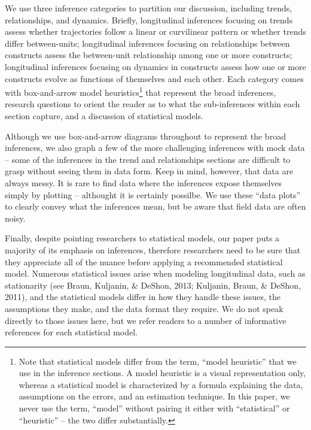 \documentclass[english,,man]{apa6}
\let\rmarkdownfootnote\footnote%
\def\footnote{\protect\rmarkdownfootnote}
\theoremstyle{definition}
\theoremstyle{definition}
\theoremstyle{definition}
\theoremstyle{remark}
\begin{document}
We use three inference categories to partition our discussion, including
trends, relationships, and dynamics. Briefly, longitudinal inferences
focusing on trends assess whether trajectories follow a linear or
curvilinear pattern or whether trends differ between-units; longitudinal
inferences focusing on relationships between constructs assess the
between-unit relationship among one or more constructs; longitudinal
inferences focusing on dynamics in constructs assess how one or more
constructs evolve as functions of themselves and each other. Each
category comes with box-and-arrow model heuristics\footnote{Note that
  statistical models differ from the term, \enquote{model heuristic}
  that we use in the inference sections. A model heuristic is a visual
  representation only, whereas a statistical model is characterized by a
  formula explaining the data, assumptions on the errors, and an
  estimation technique. In this paper, we never use the term,
  \enquote{model} without pairing it either with \enquote{statistical}
  or \enquote{heuristic} -- the two differ substantially.} that
represent the broad inferences, research questions to orient the reader
as to what the sub-inferences within each section capture, and a
discussion of statistical models.

Although we use box-and-arrow diagrams throughout to represent the broad
inferences, we also graph a few of the more challenging inferences with
mock data -- some of the inferences in the trend and relationships
sections are difficult to grasp without seeing them in data form. Keep
in mind, however, that data are always messy. It is rare to find data
where the inferences expose themselves simply by plotting -- althought
it is certainly possilbe. We use these \enquote{data plots} to clearly
convey what the inferences mean, but be aware that field data are often
noisy.

Finally, despite pointing researchers to statistical models, our paper
puts a majority of its emphasis on inferences, therefore researchers
need to be sure that they appreciate all of the nuance before applying a
recommended statistical model. Numerous statistical issues arise when
modeling longitudinal data, such as stationarity (see Braun, Kuljanin,
\& DeShon, 2013; Kuljanin, Braun, \& DeShon, 2011), and the statistical
models differ in how they handle these issues, the assumptions they
make, and the data format they require. We do not speak directly to
those issues here, but we refer readers to a number of informative
references for each statistical model.
\end{document}

